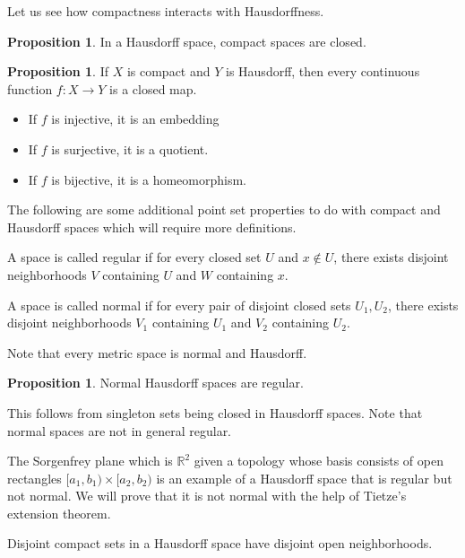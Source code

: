 \documentclass[12pt,reqno]{amsart}
\numberwithin{theorem}{section}
\theoremstyle{definition}
\theoremstyle{remark}
\numberwithin{equation}{section}
\theoremstyle{definition}
\newtheorem{prop}[theorem]{Proposition}
\newcommand{\R}{\mathbb{R}}
\begin{document}
Let us see how compactness interacts with Hausdorffness.
\begin{prop}
    In a Hausdorff space, compact spaces are closed.
\end{prop}
\begin{prop}
    If $X$ is compact and $Y $ is Hausdorff, then every continuous function $f:X\rightarrow Y$ is a closed map. 
    \begin{itemize}
        \item If $f$ is injective, it is an embedding
        \item If $f$ is surjective, it is a quotient.
        \item If $f$ is bijective, it is a homeomorphism.
    \end{itemize}
\end{prop}
The following are some additional point set properties to do with compact and Hausdorff spaces which will require more definitions.
\begin{definition}
    A space is called regular if for every closed set $U$ and $x \notin U$, there exists disjoint neighborhoods $V$ containing $U$ and $W$ containing $x$.
\end{definition}
\begin{definition}
    A space is called normal if for every pair of disjoint closed sets $U_1,U_2$, there exists disjoint neighborhoods $V_1$ containing $U_1$ and $V_2$ containing $U_2$.
\end{definition}
Note that every metric space is normal and Hausdorff.
\begin{prop}
    Normal Hausdorff spaces are regular.
\end{prop}
This follows from singleton sets being closed in Hausdorff spaces. Note that normal spaces are not in general regular.
\begin{example}
    The Sorgenfrey plane which is $\R^2$ given a topology whose basis consists of open rectangles $[a_1,b_1)\times [a_2,b_2)$ is an example of a Hausdorff space that is regular but not normal. We will prove that it is not normal with the help of Tietze's extension theorem.
\end{example}
\begin{lemma}\label{lemma}
    Disjoint compact sets in a Hausdorff space have disjoint open neighborhoods. 
\end{lemma}
\end{document}
